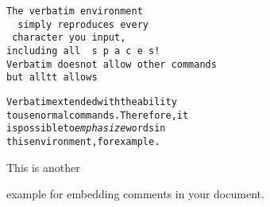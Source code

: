 \documentclass[12pt]{article}
\begin{document}
\begin{verbatim}
The verbatim environment
  simply reproduces every
 character you input,
including all  s p a c e s!
Verbatim doesnot allow other commands
but alltt allows
\end{verbatim}


\begin{alltt}
Verbatim extended with the ability
to use normal commands.  Therefore, it
is possible to \emph{emphasize} words in
this environment, for example.
\end{alltt}


This is another
\begin{comment}
rather stupid,
but helpful
\end{comment}
example for embedding
comments in your document.
\end{document}
